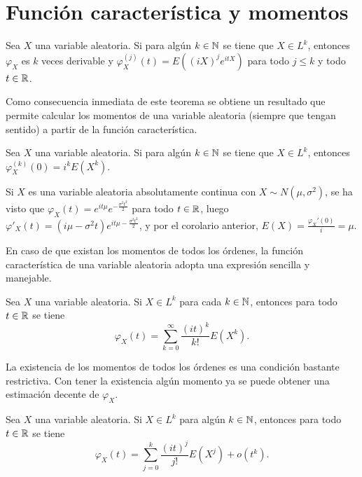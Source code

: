\documentclass[a4paper, 11pt, extrafontsizes]{memoir}
\begin{document}
\section{Función característica y momentos}

\begin{theorem}
    Sea $X$ una variable aleatoria. Si para algún $k \in \mathbb N$ se tiene que $X \in L^k$, entonces $\varphi_X$ es $k$ veces derivable y $\varphi_X^{(j)}(t) = E((iX)^j e^{itX})$ para todo $j \leq k$ y todo $t \in \mathbb R$.
\end{theorem}

Como consecuencia inmediata de este teorema se obtiene un resultado que permite calcular los momentos de una variable aleatoria (siempre que tengan sentido) a partir de la función característica.

\begin{corollary}\label{cor:1.9.13}
    Sea $X$ una variable aleatoria. Si para algún $k \in \mathbb N$ se tiene que $X \in L^k$, entonces
    $\varphi_X^{(k)}(0)=i^k E(X^k)$.
\end{corollary}

\begin{example}
    Si $X$ es una variable aleatoria absolutamente continua con $X \sim N(\mu,\sigma^2)$, se ha visto que $\varphi_X(t) = e^{it\mu}e^{-\frac{\sigma^2t^2}{2}}$ para todo $t \in \mathbb R$, luego $\varphi'_X(t) = (i\mu -\sigma^2 t) e^{it\mu-\frac{\sigma^2t^2}{2}}$, y por el corolario anterior, $E(X) = \frac{\varphi_X'(0)}{i} = \mu$.
\end{example}

En caso de que existan los momentos de todos los órdenes, la función característica de una variable aleatoria adopta una expresión sencilla y manejable.

\begin{theorem}
    Sea $X$ una variable aleatoria. Si $X \in L^k$ para cada $k \in \mathbb N$, entonces para todo $t \in \mathbb R$ se tiene
    \[\varphi_X(t) = \sum_{k=0}^\infty \frac{(it)^k}{k!}E(X^k).\]
\end{theorem}

La existencia de los momentos de todos los órdenes es una condición bastante restrictiva. Con tener la existencia algún momento ya se puede obtener una estimación decente de $\varphi_X$.

\begin{theorem}
    Sea $X$ una variable aleatoria. Si $X \in L^k$ para algún $k \in \mathbb N$, entonces para todo $t \in \mathbb R$ se tiene
    \[\varphi_X(t) = \sum_{j=0}^k \frac{(it)^j}{j!}E(X^j) + o(t^k).\]
\end{theorem}
\end{document}
